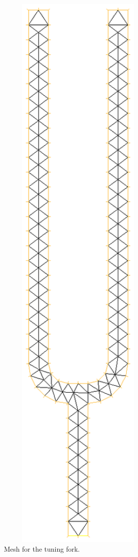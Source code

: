 \documentclass[english,3p]{elsarticle}
\begin{document}
\begin{figure}[h]
\centering
\includegraphics[width=80mm]{fork_mesh.eps}
\caption{Mesh for the tuning fork.}
\label{fig:mesh_fork}
\end{figure}
\end{document}
